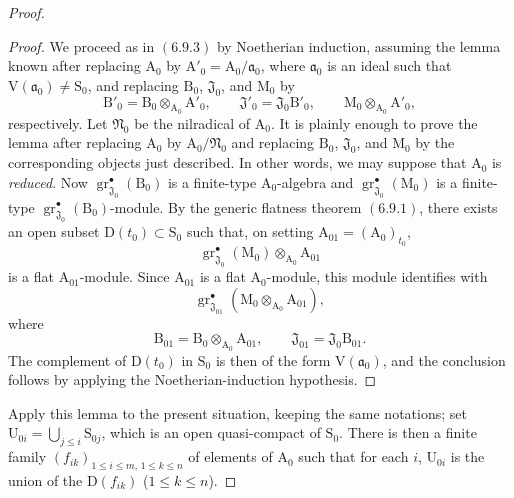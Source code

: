 \begin{proof}
\begin{proof}
We proceed as in $(6.9.3)$ by Noetherian induction, assuming the lemma known after replacing $\mathrm{A}_0$ by $\mathrm{A}'_0=\mathrm{A}_0/\mathfrak{a}_0$,
where $\mathfrak{a}_0$ is an ideal such that $\mathrm{V}(\mathfrak{a}_0)\neq\mathrm{S}_0$, and replacing $\mathrm{B}_0$, $\mathfrak{J}_0$, and $\mathrm{M}_0$ by
\[
  \mathrm{B}'_0=\mathrm{B}_0\otimes_{\mathrm{A}_0}\mathrm{A}'_0,
  \qquad
  \mathfrak{J}'_0=\mathfrak{J}_0\mathrm{B}'_0,
  \qquad
  \mathrm{M}_0\otimes_{\mathrm{A}_0}\mathrm{A}'_0,
\]
respectively. Let $\mathfrak{N}_0$ be the nilradical of $\mathrm{A}_0$. It
is plainly enough to prove the lemma after replacing $\mathrm{A}_0$ by
$\mathrm{A}_0/\mathfrak{N}_0$ and replacing $\mathrm{B}_0$,
$\mathfrak{J}_0$, and $\mathrm{M}_0$ by the corresponding objects just
described. In other words, we may suppose that $\mathrm{A}_0$ is
\emph{reduced}. Now
$\operatorname{gr}^\bullet_{\mathfrak{J}_0}(\mathrm{B}_0)$ is a finite-type
$\mathrm{A}_0$-algebra and
$\operatorname{gr}^\bullet_{\mathfrak{J}_0}(\mathrm{M}_0)$ is a finite-type
$\operatorname{gr}^\bullet_{\mathfrak{J}_0}(\mathrm{B}_0)$-module. By the generic
flatness theorem $(6.9.1)$, there exists an open subset
$\mathrm{D}(t_0)\subset\mathrm{S}_0$ such that, on setting
$\mathrm{A}_{01}=(\mathrm{A}_0)_{t_0}$,
\[
  \operatorname{gr}^\bullet_{\mathfrak{J}_0}(\mathrm{M}_0)
  \otimes_{\mathrm{A}_0}\mathrm{A}_{01}
\]
is a flat $\mathrm{A}_{01}$-module. Since $\mathrm{A}_{01}$ is a flat $\mathrm{A}_0$-module, this module identifies with
\[
  \operatorname{gr}^\bullet_{\mathfrak{J}_{01}}
  (\mathrm{M}_0\otimes_{\mathrm{A}_0}\mathrm{A}_{01}),
\]
where
\[
  \mathrm{B}_{01}=\mathrm{B}_0\otimes_{\mathrm{A}_0}\mathrm{A}_{01},
  \qquad
  \mathfrak{J}_{01}=\mathfrak{J}_0\mathrm{B}_{01}.
\]
The complement of $\mathrm{D}(t_0)$ in $\mathrm{S}_0$ is then of the form $\mathrm{V}(\mathfrak{a}_0)$, and the conclusion follows by applying the Noetherian-induction hypothesis.
\end{proof}

Apply this lemma to the present situation, keeping the same notations; set $\mathrm{U}_{0i}=\bigcup_{j\leqslant i}\mathrm{S}_{0j}$, which is an open quasi-compact of $\mathrm{S}_0$. There is then a finite family $(f_{ik})_{1\leqslant i\leqslant m,\,1\leqslant k\leqslant n}$ of elements of $\mathrm{A}_0$ such that for each $i$, $\mathrm{U}_{0i}$ is the union of the $\mathrm{D}(f_{ik})$ ($1\leqslant k\leqslant n$).



\end{proof}
